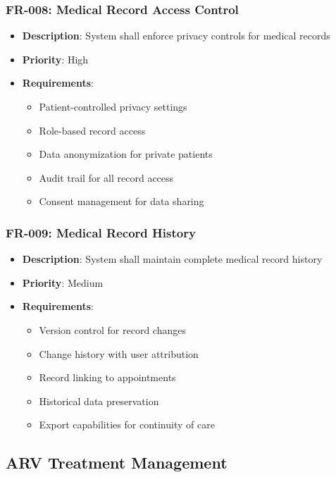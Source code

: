 \documentclass[12pt,a4paper]{article}
\begin{document}
\subsubsection{FR-008: Medical Record Access Control}
\begin{itemize}
    \item \textbf{Description}: System shall enforce privacy controls for medical records
    \item \textbf{Priority}: High
    \item \textbf{Requirements}:
    \begin{itemize}
        \item Patient-controlled privacy settings
        \item Role-based record access
        \item Data anonymization for private patients
        \item Audit trail for all record access
        \item Consent management for data sharing
    \end{itemize}
\end{itemize}

\subsubsection{FR-009: Medical Record History}
\begin{itemize}
    \item \textbf{Description}: System shall maintain complete medical record history
    \item \textbf{Priority}: Medium
    \item \textbf{Requirements}:
    \begin{itemize}
        \item Version control for record changes
        \item Change history with user attribution
        \item Record linking to appointments
        \item Historical data preservation
        \item Export capabilities for continuity of care
    \end{itemize}
\end{itemize}

\subsection{ARV Treatment Management}
\end{document}
